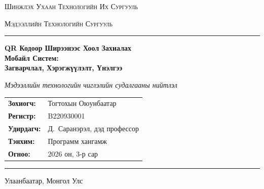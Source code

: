 \documentclass[12pt,a4paper]{article}
\begin{document}
\begin{titlepage}
  \centering
  {\scshape\Large Шинжлэх Ухаан Технологийн Их Сургууль \par}
  {\scshape\large Мэдээллийн Технологийн Сургууль \par}
  \vspace{0.4cm}
  \noindent\rule{\textwidth}{0.4pt}
  \vspace{2.5cm}

  {\huge\bfseries
    QR Кодоор Ширээнээс Хоол Захиалах\\[6pt]
    Мобайл Систем:\\[10pt]
    \large Загварчлал, Хэрэгжүүлэлт, Үнэлгээ
  \par}

  \vspace{1.5cm}
  {\large\itshape Мэдээллийн технологийн чиглэлийн судалгааны нийтлэл\par}
  \vspace{2cm}

  \begin{tabular}{ll}
    \textbf{Зохиогч:}    & Тогтохын Оюунбаатар \\[4pt]
    \textbf{Регистр:}    & B220930001 \\[4pt]
    \textbf{Удирдагч:}   & Д.~Саранэрэл, дэд профессор \\[4pt]
    \textbf{Тэнхим:}     & Программ хангамж \\[4pt]
    \textbf{Огноо:}      & 2026 он, 3-р сар \\
  \end{tabular}

  \vfill
  \noindent\rule{\textwidth}{0.4pt}
  {\small Улаанбаатар, Монгол Улс \par}
\end{titlepage}
\end{document}
